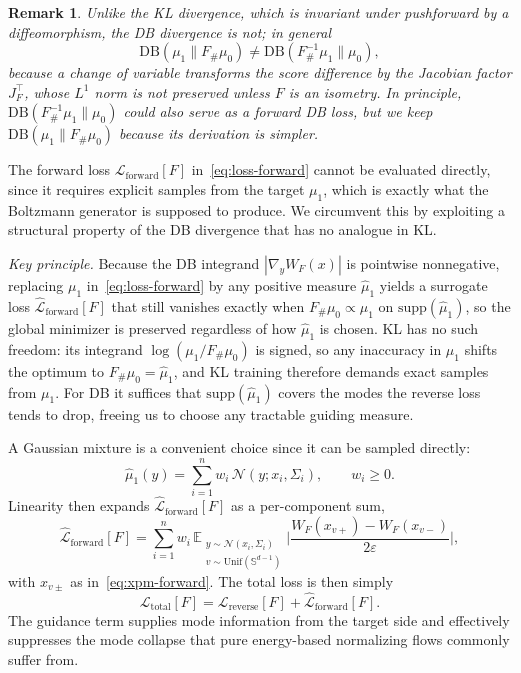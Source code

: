 \documentclass{article}
\newtheorem*{remark}{Remark}
\newcommand{\Ge}{\geqslant}
\newcommand{\DB}{\mathrm{DB}}
\theoremstyle{plain}
\begin{document}
\begin{remark}
    Unlike the KL divergence, which is invariant under pushforward by a diffeomorphism, the DB divergence is not; in general
    \begin{equation*}
        \DB(\mu_1\|F_{\#}\mu_0) \neq \DB(F^{-1}_{\#}\mu_1\|\mu_0),
    \end{equation*}
    because a change of variable transforms the score difference by the Jacobian factor $J_F^\top$, whose $L^1$ norm is not preserved unless $F$ is an isometry. In principle, $\DB(F^{-1}_{\#}\mu_1\|\mu_0)$ could also serve as a forward DB loss, but we keep $\DB(\mu_1\|F_{\#}\mu_0)$ because its derivation is simpler.
\end{remark}

The forward loss $\mathcal L_{\mathrm{forward}}[F]$ in~\eqref{eq:loss-forward} cannot be evaluated directly, since it requires explicit samples from the target $\mu_1$, which is exactly what the Boltzmann generator is supposed to produce. We circumvent this by exploiting a structural property of the DB divergence that has no analogue in KL.

\emph{Key principle.} Because the DB integrand $|\nabla_y W_F(x)|$ is pointwise nonnegative, replacing $\mu_1$ in~\eqref{eq:loss-forward} by any positive measure $\hat\mu_1$ yields a surrogate loss $\hat{\mathcal L}_{\mathrm{forward}}[F]$ that still vanishes exactly when $F_{\#}\mu_0 \propto \mu_1$ on $\mathrm{supp}(\hat\mu_1)$, so the global minimizer is preserved regardless of how $\hat\mu_1$ is chosen. KL has no such freedom: its integrand $\log(\mu_1/F_{\#}\mu_0)$ is signed, so any inaccuracy in $\mu_1$ shifts the optimum to $F_{\#}\mu_0 = \hat\mu_1$, and KL training therefore demands exact samples from $\mu_1$. For DB it suffices that $\mathrm{supp}(\hat\mu_1)$ covers the modes the reverse loss tends to drop, freeing us to choose any tractable guiding measure.

A Gaussian mixture is a convenient choice since it can be sampled directly:
\begin{equation}\label{eq:hat-mu1}
    \hat\mu_1(y) = \sum_{i=1}^n w_i\, \mathcal N(y; x_i, \Sigma_i), \qquad w_i \Ge 0.
\end{equation}
Linearity then expands $\hat{\mathcal L}_{\mathrm{forward}}[F]$ as a per-component sum,
\begin{equation}\label{eq:hat-loss-forward}
    \hat{\mathcal L}_{\mathrm{forward}}[F] = \sum_{i=1}^n w_i\, \mathbb E_{\substack{y \sim \mathcal N(x_i, \Sigma_i) \\ v \sim \mathrm{Unif}(\mathbb S^{d-1})}} \biggl|\frac{W_F(x_{v+}) - W_F(x_{v-})}{2\varepsilon}\biggr|,
\end{equation}
with $x_{v\pm}$ as in~\eqref{eq:xpm-forward}. The total loss is then simply
\begin{equation}\label{eq:total-loss}
    \mathcal L_{\mathrm{total}}[F] = \mathcal L_{\mathrm{reverse}}[F] + \hat{\mathcal L}_{\mathrm{forward}}[F].
\end{equation}
The guidance term supplies mode information from the target side and effectively suppresses the mode collapse that pure energy-based normalizing flows commonly suffer from.
\end{document}

